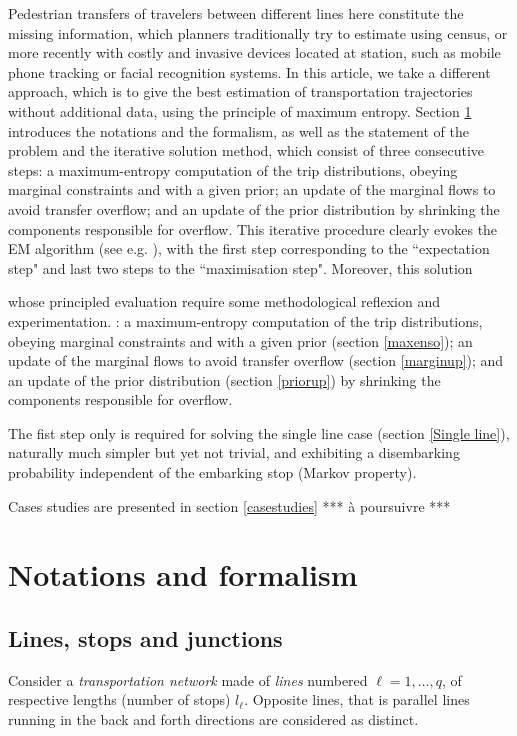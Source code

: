 \documentclass{bmcart}
\begin{document}
Pedestrian transfers of travelers between different lines here constitute the missing information, which planners traditionally try to estimate using census, or more recently with costly and invasive devices located at station, such as mobile phone tracking or facial recognition systems. In this article, we take a different approach, which is to give the best estimation of transportation trajectories without additional data, using the principle of maximum entropy. Section \ref{notforma} introduces the notations and the formalism, as well as the statement of the problem and the iterative solution method, which consist of three consecutive steps: a maximum-entropy computation of the trip distributions, obeying marginal constraints and with a given prior; an update of the marginal flows to avoid transfer overflow; and an update of the prior distribution by shrinking the components responsible for overflow. This iterative procedure clearly evokes the EM algorithm (see e.g. \cite{dempster1977maximum}  \cite{bavaud2009information}), with the first step corresponding to the ``expectation step" and last two steps to the ``maximisation step". Moreover, this solution 



whose principled evaluation require some methodological reflexion and experimentation. : a maximum-entropy computation of the trip distributions, obeying marginal constraints and with a given prior (section \ref{maxenso}); an update of the marginal flows to avoid transfer overflow (section \ref{marginup}); and an update of the prior distribution  (section \ref{priorup}) by shrinking the components responsible for overflow. 

The fist step only is required for solving the single line case (section \ref{Single line}), naturally much simpler but  yet  not trivial, and exhibiting a disembarking probability independent of the embarking stop (Markov property). 

Cases studies are presented in section \ref{casestudies} *** à poursuivre *** 






\section{Notations and formalism}
\label{notforma}
\subsection{Lines, stops  and junctions}
\label{Lines and junctions}
Consider a \emph{transportation network} made of \emph{lines} numbered $\ell=1,\ldots, q$, of respective lengths (number of stops) $l_\ell$.  Opposite lines, that is parallel lines running in the back and forth directions are considered as distinct. 
\end{document}
